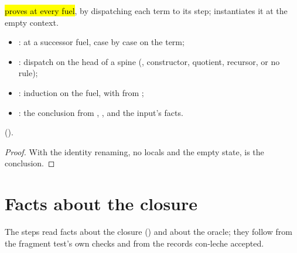 \begin{lemma}
  \label{lem:EraseProof-Steps-erasePure_erases_of}
  \leanok
   \hl{ proves  at every fuel}, by dispatching each term to its step;  instantiates it at the empty context.
  \begin{itemize}
  \item {}:  at a successor fuel, case by case on the term;
  \item {}: dispatch on the head of a spine (, constructor, quotient, recursor, or no rule);
  \item {}: induction on the fuel, with  from ;
  \item {}: the conclusion from , ,  and the input's facts.
  \end{itemize}
    ().
\end{lemma}
\begin{proof}
  \leanok
   With the identity renaming, no locals and the empty state,  is the conclusion.
\end{proof}

\section{Facts about the closure}\label{sec:core-facts}

The steps read facts about the closure () and about the oracle; they follow from the fragment test's own checks and from the records con-leche accepted.

